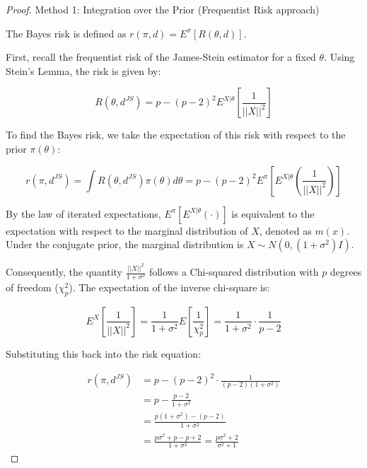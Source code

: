 \documentclass[
  letterpaper,
  DIV=11,
  numbers=noendperiod]{scrreprt}
\renewcommand{\[}{\begin{equation}}
\renewcommand{\]}{\end{equation}}
\theoremstyle{definition}
\theoremstyle{plain}
\theoremstyle{plain}
\theoremstyle{plain}
\theoremstyle{definition}
\theoremstyle{plain}
\theoremstyle{remark}
\begin{document}
\begin{proof}
\leavevmode

Method 1: Integration over the Prior (Frequentist Risk approach)

The Bayes risk is defined as \(r(\pi, d) = E^\pi [ R(\theta, d) ]\).

First, recall the frequentist risk of the James-Stein estimator for a
fixed \(\theta\). Using Stein's Lemma, the risk is given by:

\[
R(\theta, d^{JS}) = p - (p-2)^2 E^{X|\theta} \left[ \frac{1}{||X||^2} \right]
\]

To find the Bayes risk, we take the expectation of this risk with
respect to the prior \(\pi(\theta)\):

\[
r(\pi, d^{JS}) = \int R(\theta, d^{JS}) \pi(\theta) d\theta = p - (p-2)^2 E^\pi \left[ E^{X|\theta} \left( \frac{1}{||X||^2} \right) \right]
\]

By the law of iterated expectations, \(E^\pi [ E^{X|\theta} (\cdot) ]\)
is equivalent to the expectation with respect to the marginal
distribution of \(X\), denoted as \(m(x)\). Under the conjugate prior,
the marginal distribution is \(X \sim N(0, (1+\sigma^2)I)\).

Consequently, the quantity \(\frac{||X||^2}{1+\sigma^2}\) follows a
Chi-squared distribution with \(p\) degrees of freedom (\(\chi^2_p\)).
The expectation of the inverse chi-square is:

\[
E^X \left[ \frac{1}{||X||^2} \right] = \frac{1}{1+\sigma^2} E \left[ \frac{1}{\chi^2_p} \right] = \frac{1}{1+\sigma^2} \cdot \frac{1}{p-2}
\]

Substituting this back into the risk equation:

\[
\begin{aligned}
r(\pi, d^{JS}) &= p - (p-2)^2 \cdot \frac{1}{(p-2)(1+\sigma^2)} \\
&= p - \frac{p-2}{1+\sigma^2} \\
&= \frac{p(1+\sigma^2) - (p-2)}{1+\sigma^2} \\
&= \frac{p\sigma^2 + p - p + 2}{1+\sigma^2} = \frac{p\sigma^2 + 2}{\sigma^2 + 1}
\end{aligned}
\]

\end{proof}
\end{document}
